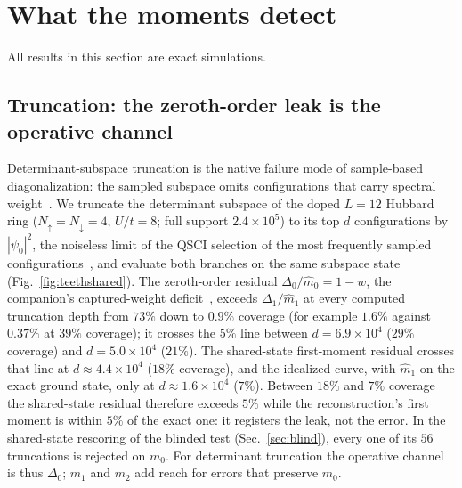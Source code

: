 \documentclass[aps,prb,reprint,onecolumn,12pt,superscriptaddress,longbibliography,floatfix]{revtex4-2}
\begin{document}
\section{What the moments detect}
\label{sec:detectsim}
\label{sec:teeth}
All results in this section are exact simulations.

\subsection{Truncation: the zeroth-order leak is the operative channel}
\label{sec:trunc}
Determinant-subspace truncation is the native failure mode of sample-based diagonalization: the sampled subspace omits configurations that carry spectral weight~\cite{SQDchem2025,QSCI2023}. We truncate the determinant subspace of the doped $L=12$ Hubbard ring ($N_\uparrow=N_\downarrow=4$, $U/t=8$; full support $2.4\times10^5$) to its top $d$ configurations by $|\psi_0|^2$, the noiseless limit of the QSCI selection of the most frequently sampled configurations~\cite{QSCI2023}, and evaluate both branches on the same subspace state (Fig.~\ref{fig:teethshared}). The zeroth-order residual $\Delta_0/\widehat m_0=1-w$, the companion's captured-weight deficit~\cite{SQDspec2608}, exceeds $\Delta_1/\widehat m_1$ at every computed truncation depth from $73\%$ down to $0.9\%$ coverage (for example $1.6\%$ against $0.37\%$ at $39\%$ coverage); it crosses the $5\%$ line between $d=6.9\times10^4$ ($29\%$ coverage) and $d=5.0\times10^4$ ($21\%$). The shared-state first-moment residual crosses that line at $d\approx4.4\times10^{4}$ ($18\%$ coverage), and the idealized curve, with $\widehat m_1$ on the exact ground state, only at $d\approx1.6\times10^{4}$ ($7\%$). Between $18\%$ and $7\%$ coverage the shared-state residual therefore exceeds $5\%$ while the reconstruction's first moment is within $5\%$ of the exact one: it registers the leak, not the error. In the shared-state rescoring of the blinded test (Sec.~\ref{sec:blind}), every one of its $56$ truncations is rejected on $m_0$. For determinant truncation the operative channel is thus $\Delta_0$; $m_1$ and $m_2$ add reach for errors that preserve $m_0$.
\end{document}
